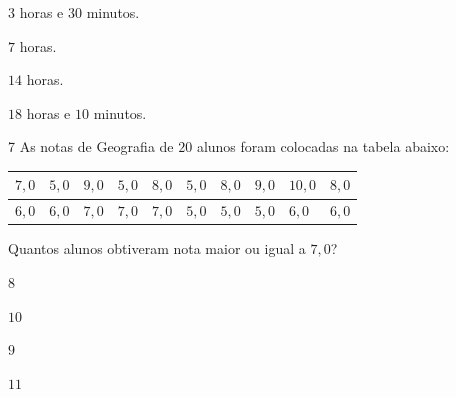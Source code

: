 \begin{escolha}
\item $3$ horas e $30$ minutos.
\item $7$ horas.
\item $14$ horas.
\item $18$ horas e $10$ minutos.
\end{escolha}




\num{7}  As notas de Geografia de $20$ alunos foram colocadas na tabela abaixo:


\begin{longtable}[]{@{}llllllllll@{}}
\toprule
$7,0$ & $5,0$ & $9,0$ & $5,0$ & $8,0$ & $5,0$ & $8,0$ & $9,0$ & $10,0$ &
$8,0$\tabularnewline
\midrule
\endhead
$6,0$ & $6,0$ & $7,0$ & $7,0$ & $7,0$ & $5,0$ & $5,0$ & $5,0$ & $6,0$ & $6,0$\tabularnewline
\bottomrule
\end{longtable}

Quantos alunos obtiveram nota maior ou igual a $7,0$?

\begin{escolha}
\item $8$
\item $10$
\item $9$
\item $11$
\end{escolha}


